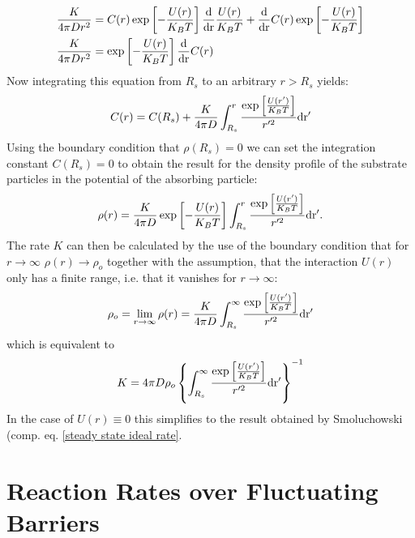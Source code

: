 \begin{align}
    \frac{K}{4 \pi D r^2} &= C(r) \exp \left[ - \frac{U(r)}{K_B T} \right] \frac{\rm d}{\rm d r} \frac{U(r)}{K_B T} + \frac{\rm d}{\rm d r} C(r) \exp \left[ - \frac{U(r)}{K_B T} \right] \nonumber\\
    \frac{K}{ 4 \pi D r^2} &= \exp \left[ -\frac{U(r)}{K_B T} \right] \frac{\rm d }{\rm d r} C(r)
    \label{equation_C(r)}
\end{align}
Now integrating this equation from $R_s$ to an arbitrary $r>R_s$ yields:
\begin{equation}
    C(r) = C(R_s) + \frac{K}{4 \pi D}\int_{R_s}^{r} \frac{\exp \left[ \frac{U(r')}{K_B T}\right]}{r'^2} \rm d r'
    \label{solution_C(r)}
\end{equation}
Using the boundary condition that $\rho(R_s)=0$  we can set the integration constant $C(R_s) = 0$ to obtain the result for the density profile of the substrate particles in the potential of the absorbing particle:
\begin{equation}
    \rho(r) = \frac{K}{4 \pi D}\exp \left[ -\frac{U(r)}{K_B T} \right] \int_{R_s}^{r} \frac{\exp \left[ \frac{U(r')}{K_B T}\right]}{r'^2} \rm d r'.
    \label{rho_debye}
\end{equation}
The rate $K$ can then be calculated by the use of the boundary condition that for $r \rightarrow \infty$ $\rho(r) \rightarrow \rho_o$ together with the assumption, that the interaction $U(r)$ only has a finite range, i.e. that it vanishes for $r \rightarrow \infty$:
\begin{equation}
    \rho_o = \lim_{r\rightarrow \infty} \rho(r) = \frac{K}{4 \pi D}\int_{R_s}^{\infty} \frac{\exp \left[ \frac{U(r')}{K_B T}\right]}{r'^2} \rm d r'
    \label{lim_rho_debye_infty}
\end{equation}
which is equivalent to 
\begin{equation}
    K = 4 \pi D \rho_o \left\{\int_{R_s}^{\infty} \frac{\exp \left[ \frac{U(r')}{K_B T}\right]}{r'^2} \rm d r' \right\}^{-1}
    \label{K_Debye}
\end{equation}
In the case of $U(r) \equiv 0$ this simplifies to the result obtained by Smoluchowski (comp. eq. \eqref{steady state ideal rate}.

\newpage
\section{Reaction Rates over Fluctuating Barriers}
\label{Reaction_Rates_over_Fluctuating_Barriers}

